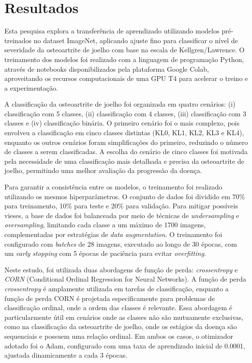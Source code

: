 \chapter{Resultados}\label{cap:resultados}

Esta pesquisa explora a transferência de aprendizado utilizando modelos pré-treinados no dataset ImageNet, aplicando ajuste fino para classificar o nível de severidade da osteoartrite de joelho com base na escala de Kellgren/Lawrence. O treinamento dos modelos foi realizado com a linguagem de programação Python, através de notebooks disponibilizados pela plataforma Google Colab, aproveitando os recursos computacionais de uma GPU T4 para acelerar o treino e a experimentação.

A classificação da osteoartrite de joelho foi organizada em quatro cenários: (i) classificação com 5 classes, (ii) classificação com 4 classes, (iii) classificação com 3 classes e (iv) classificação binária. O primeiro cenário foi o mais complexo, pois envolveu a classificação em cinco classes distintas (KL0, KL1, KL2, KL3 e KL4), enquanto os outros cenários foram simplificações do primeiro, reduzindo o número de classes a serem classificadas. A escolha do cenário de cinco classes foi motivada pela necessidade de uma classificação mais detalhada e precisa da osteoartrite de joelho, permitindo uma melhor avaliação da progressão da doença.

Para garantir a consistência entre os modelos, o treinamento foi realizado utilizando os mesmos hiperparâmetros. O conjunto de dados foi dividido em 70\% para treinamento, 10\% para teste e 20\% para validação. Para mitigar possíveis vieses, a base de dados foi balanceada por meio de técnicas de \textit{undersampling} e \textit{oversampling}, limitando cada classe a um máximo de 1700 imagens, complementadas por estratégias de \textit{data augmentation}. O treinamento foi configurado com \textit{batches} de 28 imagens, executado ao longo de 30 épocas, com um \textit{early stopping} com 5 épocas de paciência para evitar \textit{overfitting}.

Neste estudo, foi utilizada duas abordagens de função de perda: \textit{crossentropy} e \textit{CORN} (Conditional Ordinal Regression for Neural Networks). A função de perda \textit{crossentropy} é amplamente utilizada em tarefas de classificação, enquanto a função de perda CORN é projetada especificamente para problemas de classificação ordinal, onde a ordem das classes é relevante. Essa abordagem é particularmente útil em cenários onde as classes não são mutuamente exclusivas, como na classificação da osteoartrite de joelho, onde os estágios da doença são sequenciais e possuem uma relação ordinal. Em ambos os casos, o otimizador adotado foi o Adam, configurado com uma taxa de aprendizado inicial de 0.0001, ajustada dinamicamente a cada 3 épocas.

